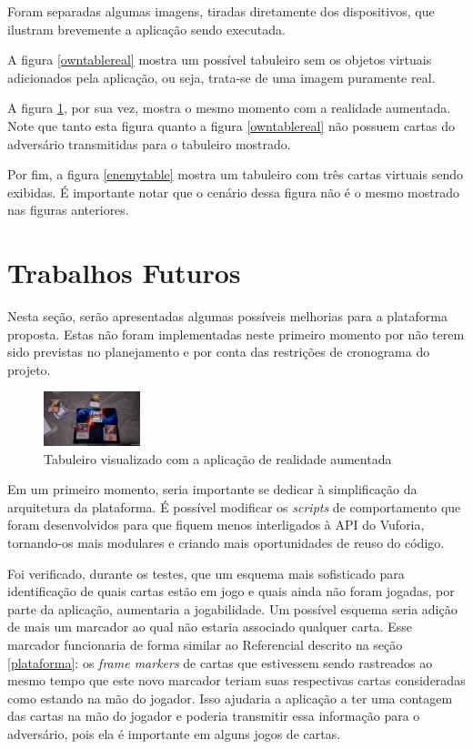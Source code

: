 \documentclass[conference]{IEEEtran}
\begin{document}
Foram separadas algumas imagens, tiradas diretamente dos dispositivos, que 
ilustram brevemente a aplicação sendo executada.

A figura \ref{owntablereal} mostra um possível tabuleiro sem os objetos virtuais 
adicionados pela aplicação, ou seja, trata-se de uma imagem puramente real.

A figura \ref{owntableaug}, por sua vez, mostra o mesmo momento com a realidade 
aumentada. Note que tanto esta figura quanto a figura \ref{owntablereal} não 
possuem cartas do adversário transmitidas para o tabuleiro mostrado.

Por fim, a figura \ref{enemytable} mostra um tabuleiro com três cartas virtuais 
sendo exibidas. É importante notar que o cenário dessa figura não é o mesmo 
mostrado nas figuras anteriores.

\section{Trabalhos Futuros}
\label{trab_fut}
Nesta seção, serão apresentadas algumas possíveis melhorias para a plataforma
proposta. Estas não foram implementadas neste primeiro momento por não terem 
sido previstas no planejamento e por conta das restrições de cronograma do 
projeto.

\begin{figure}[t]
	\caption{Tabuleiro visualizado com a aplicação de realidade aumentada}
	\label{owntableaug}
	\centering
	\includegraphics[width=0.25\textwidth]{owntableaug}
\end{figure}

Em um primeiro momento, seria importante se dedicar à simplificação da 
arquitetura da plataforma. É possível modificar os \textit{scripts} de 
comportamento que foram desenvolvidos para que fiquem menos interligados à API 
do Vuforia, tornando-os mais modulares e criando mais oportunidades de reuso do 
código.

Foi verificado, durante os testes, que um esquema mais sofisticado para 
identificação de quais cartas estão em jogo e quais ainda não foram jogadas, por 
parte da aplicação, aumentaria a jogabilidade. Um possível esquema seria adição 
de mais um marcador ao qual não estaria associado qualquer carta. Esse marcador 
funcionaria de forma similar ao Referencial descrito na seção \ref{plataforma}: 
os \textit{frame markers} de cartas que estivessem sendo rastreados 
ao mesmo tempo que este novo marcador teriam suas respectivas cartas 
consideradas como estando na mão do jogador. Isso ajudaria a aplicação a ter uma 
contagem das cartas na mão do jogador e poderia transmitir essa informação para o 
adversário, pois ela é importante em alguns jogos de cartas.
\end{document}

